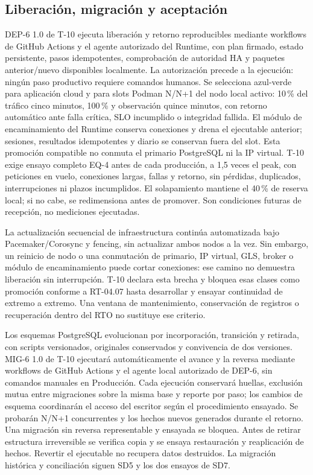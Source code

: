 \subsection{Liberación, migración y aceptación}
DEP-6 1.0 de T-10 ejecuta liberación y retorno reproducibles mediante workflows de GitHub Actions y el agente autorizado del Runtime, con plan firmado, estado persistente, pasos idempotentes, comprobación de autoridad HA y paquetes anterior/nuevo disponibles localmente. La autorización precede a la ejecución: ningún paso productivo requiere comandos humanos. Se selecciona azul-verde para aplicación cloud y para slots Podman N/N+1 del nodo local activo: 10\,\% del tráfico cinco minutos, 100\,\% y observación quince minutos, con retorno automático ante falla crítica, SLO incumplido o integridad fallida. El módulo de encaminamiento del Runtime conserva conexiones y drena el ejecutable anterior; sesiones, resultados idempotentes y diario se conservan fuera del slot. Esta promoción compatible no conmuta el primario PostgreSQL ni la IP virtual. T-10 exige ensayo completo EQ-4 antes de cada producción, a 1,5 veces el peak, con peticiones en vuelo, conexiones largas, fallas y retorno, sin pérdidas, duplicados, interrupciones ni plazos incumplidos. El solapamiento mantiene el 40\,\% de reserva local; si no cabe, se redimensiona antes de promover. Son condiciones futuras de recepción, no mediciones ejecutadas. \parencite[RT-04.06/07, p.~11]{sd6-bt}

La actualización secuencial de infraestructura continúa automatizada bajo Pacemaker/Corosync y fencing, sin actualizar ambos nodos a la vez. Sin embargo, un reinicio de nodo o una conmutación de primario, IP virtual, GLS, broker o módulo de encaminamiento puede cortar conexiones: ese camino no demuestra liberación sin interrupción. T-10 declara esta brecha y bloquea esas clases como promoción conforme a RT-04.07 hasta desarrollar y ensayar continuidad de extremo a extremo. Una ventana de mantenimiento, conservación de registros o recuperación dentro del RTO no sustituye ese criterio. \parencite[art.~20, pp.~14--15]{sd6-ba}

Los esquemas PostgreSQL evolucionan por incorporación, transición y retirada, con scripts versionados, originales conservados y convivencia de dos versiones. MIG-6 1.0 de T-10 ejecutará automáticamente el avance y la reversa mediante workflows de GitHub Actions y el agente local autorizado de DEP-6, sin comandos manuales en Producción. Cada ejecución conservará huellas, exclusión mutua entre migraciones sobre la misma base y reporte por paso; los cambios de esquema coordinarán el acceso del escritor según el procedimiento ensayado. Se probarán N/N+1 concurrentes y los hechos nuevos generados durante el retorno. Una migración sin reversa representable y ensayada se bloquea. Antes de retirar estructura irreversible se verifica copia y se ensaya restauración y reaplicación de hechos. Revertir el ejecutable no recupera datos destruidos. La migración histórica y conciliación siguen SD5 y los dos ensayos de SD7. \parencite[RT-04.10, p.~11; cap.~20, pp.~34--35]{sd6-bt}

